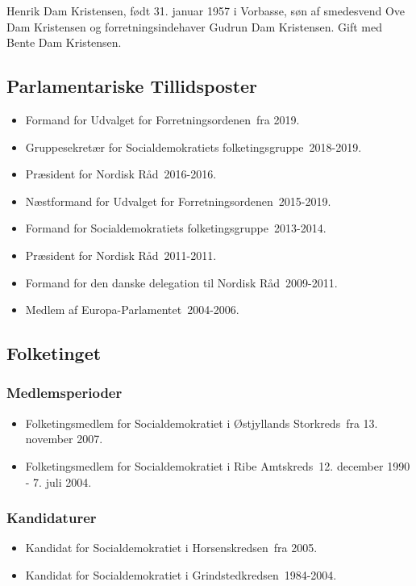 \documentclass[11pt, a4paper]{awesome-cv}
\begin{document}
\makecvheader[R]
\makelettertitle
\begin{cvletter}
Henrik Dam Kristensen, født 31. januar 1957 i Vorbasse, søn af smedesvend Ove Dam Kristensen og forretningsindehaver Gudrun Dam Kristensen. Gift med Bente Dam Kristensen.

\subsection*{Parlamentariske Tillidsposter}
\begin{itemize}
\item Formand for Udvalget for Forretningsordenen fra 2019.
\item Gruppesekretær for Socialdemokratiets folketingsgruppe 2018-2019.
\item Præsident for Nordisk Råd 2016-2016.
\item Næstformand for Udvalget for Forretningsordenen 2015-2019.
\item Formand for Socialdemokratiets folketingsgruppe 2013-2014.
\item Præsident for Nordisk Råd 2011-2011.
\item Formand for den danske delegation til Nordisk Råd 2009-2011.
\item Medlem af Europa-Parlamentet 2004-2006.
\end{itemize}
\subsection*{Folketinget}
\subsubsection*{Medlemsperioder}
\begin{itemize}
\item Folketingsmedlem for Socialdemokratiet i Østjyllands Storkreds fra 13. november 2007.
\item Folketingsmedlem for Socialdemokratiet i Ribe Amtskreds 12. december 1990 - 7. juli 2004.
\end{itemize}
\subsubsection*{Kandidaturer}
\begin{itemize}
\item Kandidat for Socialdemokratiet i Horsenskredsen fra 2005.
\item Kandidat for Socialdemokratiet i Grindstedkredsen 1984-2004.
\end{itemize}

\end{cvletter}
\end{document}
